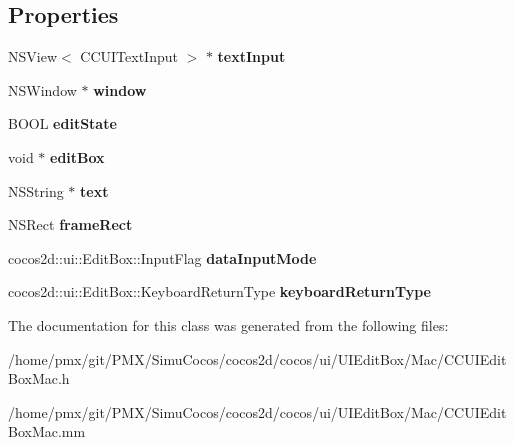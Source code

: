 \subsection*{Properties}
\begin{DoxyCompactItemize}
\item 
\mbox{\label{interfaceUIEditBoxImplMac_a684060583ddedfcaaddefbf376dce2d9}} 
N\+S\+View$<$ C\+C\+U\+I\+Text\+Input $>$ $\ast$ {\bfseries text\+Input}
\item 
\mbox{\label{interfaceUIEditBoxImplMac_a130f399802ff6c01adc1762ee43a1c44}} 
N\+S\+Window $\ast$ {\bfseries window}
\item 
\mbox{\label{interfaceUIEditBoxImplMac_a8eb1c26976bc051415b3b9e5c699e14e}} 
B\+O\+OL {\bfseries edit\+State}
\item 
\mbox{\label{interfaceUIEditBoxImplMac_aba1d3faa5e06716f6ce87032e762b976}} 
void $\ast$ {\bfseries edit\+Box}
\item 
\mbox{\label{interfaceUIEditBoxImplMac_aa14daa995ba3b0050041b7193d1749cf}} 
N\+S\+String $\ast$ {\bfseries text}
\item 
\mbox{\label{interfaceUIEditBoxImplMac_a8ae49d36d0d2939f93663500b21a7533}} 
N\+S\+Rect {\bfseries frame\+Rect}
\item 
\mbox{\label{interfaceUIEditBoxImplMac_a9ce8646d7be1b2d64b56f5d222316082}} 
cocos2d\+::ui\+::\+Edit\+Box\+::\+Input\+Flag {\bfseries data\+Input\+Mode}
\item 
\mbox{\label{interfaceUIEditBoxImplMac_af4fa1a12742ea5619f6ab762d2a355eb}} 
cocos2d\+::ui\+::\+Edit\+Box\+::\+Keyboard\+Return\+Type {\bfseries keyboard\+Return\+Type}
\end{DoxyCompactItemize}


The documentation for this class was generated from the following files\+:\begin{DoxyCompactItemize}
\item 
/home/pmx/git/\+P\+M\+X/\+Simu\+Cocos/cocos2d/cocos/ui/\+U\+I\+Edit\+Box/\+Mac/C\+C\+U\+I\+Edit\+Box\+Mac.\+h\item 
/home/pmx/git/\+P\+M\+X/\+Simu\+Cocos/cocos2d/cocos/ui/\+U\+I\+Edit\+Box/\+Mac/C\+C\+U\+I\+Edit\+Box\+Mac.\+mm\end{DoxyCompactItemize}
